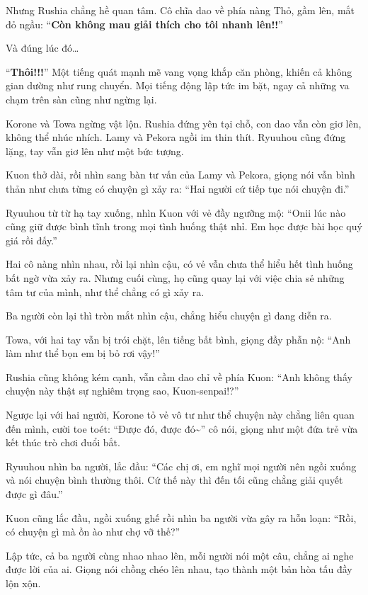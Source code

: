 \documentclass[../main.tex]{subfiles}
\begin{document}
Nhưng Rushia chẳng hề quan tâm. Cô chĩa dao về phía nàng Thỏ, gầm lên, mắt đỏ ngầu: ``\textbf{Còn không mau giải thích cho tôi nhanh lên!!}''

Và đúng lúc đó\dots

``{\Large \textbf{Thôi!!!}}'' Một tiếng quát mạnh mẽ vang vọng khắp căn phòng, khiến cả không gian dường như rung chuyển. Mọi tiếng động lập tức im bặt, ngay cả những va chạm trên sàn cũng như ngừng lại.

Korone và Towa ngừng vật lộn. Rushia đứng yên tại chỗ, con dao vẫn còn giơ lên, không thể nhúc nhích. Lamy và Pekora ngồi im thin thít. Ryuuhou cũng đứng lặng, tay vẫn giơ lên như một bức tượng.

Kuon thở dài, rồi nhìn sang bàn tư vấn của Lamy và Pekora, giọng nói vẫn bình thản như chưa từng có chuyện gì xảy ra: ``Hai người cứ tiếp tục nói chuyện đi.''

Ryuuhou từ từ hạ tay xuống, nhìn Kuon với vẻ đầy ngưỡng mộ: ``Onii lúc nào cũng giữ được bình tĩnh trong mọi tình huống thật nhỉ. Em học được bài học quý giá rồi đấy.''

Hai cô nàng nhìn nhau, rồi lại nhìn cậu, có vẻ vẫn chưa thể hiểu hết tình huống bất ngờ vừa xảy ra. Nhưng cuối cùng, họ cũng quay lại với việc chia sẻ những tâm tư của mình, như thể chẳng có gì xảy ra.

Ba người còn lại thì tròn mắt nhìn cậu, chẳng hiểu chuyện gì đang diễn ra.

Towa, với hai tay vẫn bị trói chặt, lên tiếng bất bình, giọng đầy phẫn nộ: ``Anh làm như thể bọn em bị bỏ rơi vậy!''

Rushia cũng không kém cạnh, vẫn cầm dao chỉ về phía Kuon: ``Anh không thấy chuyện này thật sự nghiêm trọng sao, Kuon-senpai!?''

Ngược lại với hai người, Korone tỏ vẻ vô tư như thể chuyện này chẳng liên quan đến mình, cười toe toét: ``Được đó, được đó\~{}'' cô nói, giọng như một đứa trẻ vừa kết thúc trò chơi đuổi bắt.

Ryuuhou nhìn ba người, lắc đầu: ``Các chị ơi, em nghĩ mọi người nên ngồi xuống và nói chuyện bình thường thôi. Cứ thế này thì đến tối cũng chẳng giải quyết được gì đâu.''

Kuon cũng lắc đầu, ngồi xuống ghế rồi nhìn ba người vừa gây ra hỗn loạn: ``Rồi, có chuyện gì mà ồn ào như chợ vỡ thế?''

Lập tức, cả ba người cùng nhao nhao lên, mỗi người nói một câu, chẳng ai nghe được lời của ai. Giọng nói chồng chéo lên nhau, tạo thành một bản hòa tấu đầy lộn xộn.
\end{document}
